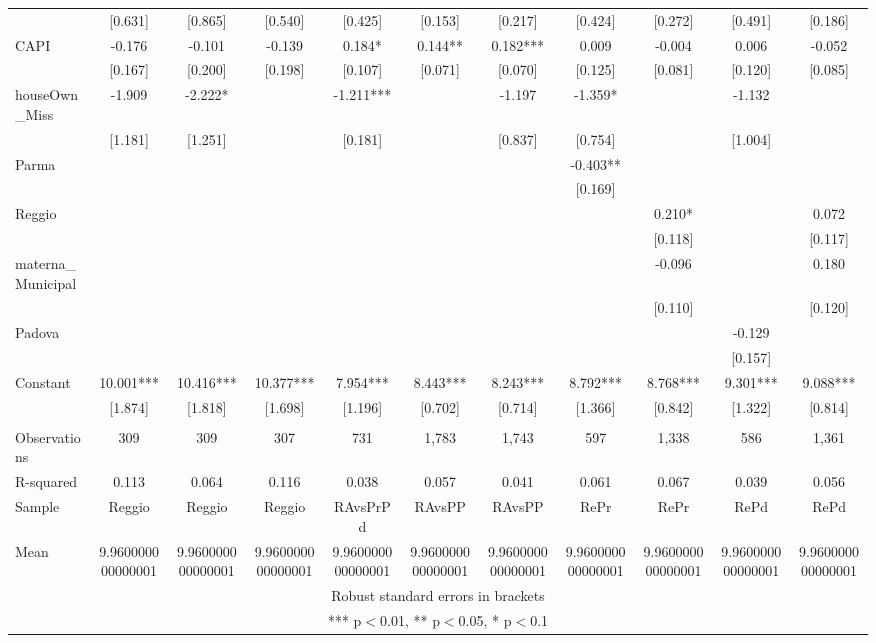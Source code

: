 \documentclass[]{article}
\begin{document}
\begin{tabular}{lcccccccccc}
 & [0.631] & [0.865] & [0.540] & [0.425] & [0.153] & [0.217] & [0.424] & [0.272] & [0.491] & [0.186] \\
CAPI & -0.176 & -0.101 & -0.139 & 0.184* & 0.144** & 0.182*** & 0.009 & -0.004 & 0.006 & -0.052 \\
 & [0.167] & [0.200] & [0.198] & [0.107] & [0.071] & [0.070] & [0.125] & [0.081] & [0.120] & [0.085] \\
houseOwn\_Miss & -1.909 & -2.222* &  & -1.211*** &  & -1.197 & -1.359* &  & -1.132 &  \\
 & [1.181] & [1.251] &  & [0.181] &  & [0.837] & [0.754] &  & [1.004] &  \\
Parma &  &  &  &  &  &  & -0.403** &  &  &  \\
 &  &  &  &  &  &  & [0.169] &  &  &  \\
Reggio &  &  &  &  &  &  &  & 0.210* &  & 0.072 \\
 &  &  &  &  &  &  &  & [0.118] &  & [0.117] \\
materna\_Municipal &  &  &  &  &  &  &  & -0.096 &  & 0.180 \\
 &  &  &  &  &  &  &  & [0.110] &  & [0.120] \\
Padova &  &  &  &  &  &  &  &  & -0.129 &  \\
 &  &  &  &  &  &  &  &  & [0.157] &  \\
Constant & 10.001*** & 10.416*** & 10.377*** & 7.954*** & 8.443*** & 8.243*** & 8.792*** & 8.768*** & 9.301*** & 9.088*** \\
 & [1.874] & [1.818] & [1.698] & [1.196] & [0.702] & [0.714] & [1.366] & [0.842] & [1.322] & [0.814] \\
 &  &  &  &  &  &  &  &  &  &  \\
Observations & 309 & 309 & 307 & 731 & 1,783 & 1,743 & 597 & 1,338 & 586 & 1,361 \\
R-squared & 0.113 & 0.064 & 0.116 & 0.038 & 0.057 & 0.041 & 0.061 & 0.067 & 0.039 & 0.056 \\
Sample & Reggio & Reggio & Reggio & RAvsPrPd & RAvsPP & RAvsPP & RePr & RePr & RePd & RePd \\
 Mean & 9.960000000000001 & 9.960000000000001 & 9.960000000000001 & 9.960000000000001 & 9.960000000000001 & 9.960000000000001 & 9.960000000000001 & 9.960000000000001 & 9.960000000000001 & 9.960000000000001 \\ \hline
\multicolumn{11}{c}{ Robust standard errors in brackets} \\
\multicolumn{11}{c}{ *** p$<$0.01, ** p$<$0.05, * p$<$0.1} \\

\end{tabular}
\end{document}
